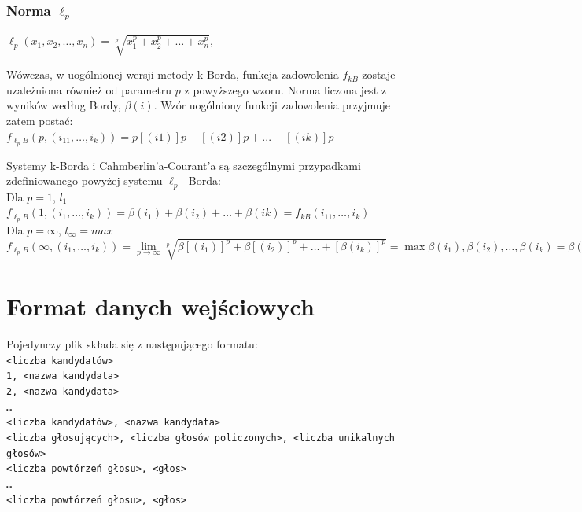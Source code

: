 \documentclass[pdflatex,11pt]{../aghdoc_version2}
\begin{document}
\subsubsection{Norma $\ell_p$}
\label{subsubsection:norma_ell_p}

$\ell_p(x_1,x_2,\dots, x_n) = \sqrt[p]{x_1^p+x_2^p+\dots+x_n^p},$ 


Wówczas, w uogólnionej wersji metody k-Borda, funkcja zadowolenia $f_{kB}$ zostaje uzależniona również od parametru $p$ z powyższego wzoru. Norma liczona jest z wyników według Bordy, $\beta(i)$. Wzór uogólniony funkcji zadowolenia przyjmuje zatem postać:\\
$f_{\ell_pB}(p,(i_11,\dots,i_k))=p[(i1)]p+[(i2)]p+...+[(ik)]p$


Systemy  k-Borda i Cahmberlin’a-Courant’a są szczególnymi przypadkami zdefiniowanego powyżej systemu $\ell_p$- Borda:\\
Dla $p = 1$, $l_1$\\
$f_{\ell_pB}(1,(i_1, \dots ,i_k)) = \beta(i_1) + \beta(i_2) + \dots + \beta(ik) = f_{kB}(i_11, \dots,i_k)$\\
Dla $p= \infty$,  $l_{\infty}={max}$\\
$f_{\ell_pB}(\infty,(i_1, \dots ,i_k))=\lim\limits_{p \to \infty} \sqrt[p]{\beta\left[(i_1)\right]^p+\beta\left[(i_2)\right]^p+ \dots +\left[\beta(i_k)\right]^p}=\max{\beta(i_1),\beta(i_2),\dots,\beta(i_k)} = \beta(i_1)=f_{CC}$

\section{Format danych wejściowych}
\label{sec:format_danych_wejsciowych}
Pojedynczy plik składa się z następującego formatu:\\
\texttt{<liczba kandydatów> \\
1, <nazwa kandydata> \\
2, <nazwa kandydata> \\
… \\
<liczba kandydatów>, <nazwa kandydata> \\
<liczba głosujących>, <liczba głosów policzonych>, <liczba unikalnych głosów> \\
<liczba powtórzeń głosu>, <głos> \\
… \\
<liczba powtórzeń głosu>, <głos>}
\end{document}
